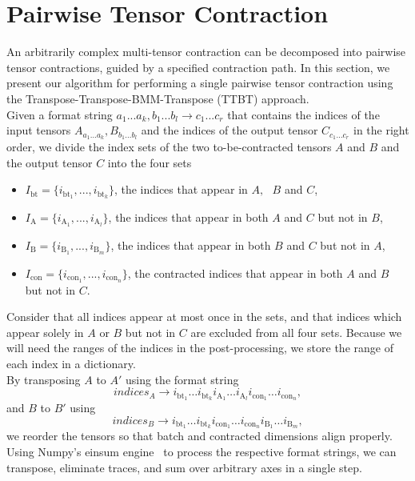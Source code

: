 \section{Pairwise Tensor Contraction}
An arbitrarily complex multi-tensor contraction can be decomposed into pairwise tensor contractions, guided by a specified
contraction path. In this section, we present our algorithm for performing a single pairwise tensor contraction using the Transpose-Transpose-BMM-Transpose (TTBT) approach.\\

\noindent Given a format string $a_1...a_k,b_1...b_l\rightarrow c_1...c_r$ that contains the indices of the input tensors $A_{a_1...a_k},B_{b_1...b_l}$ and the indices of the output tensor $C_{c_1...c_r}$ in the right order, we divide the index sets of the two to-be-contracted tensors $A$ and $B$ and the output tensor $C$ into the four sets
\begin{itemize}
    \item $I_{\text{bt}}= \{i_{\text{bt}_1},...,i_{\text{bt}_k}\}$, the indices that appear in $A, \text{ }B$ and $C$,
    \item $I_\text{A}=\{i_{\text{A}_1}, ...,i_{\text{A}_l}\}$, the indices that appear in both $A$ and $C$ but not in $B$,
    \item $I_\text{B}= \{i_{\text{B}_1} ,...,i_{\text{B}_m}\}$, the indices that appear in both $B$ and $C$ but not in $A$,
    \item $I_{\text{con}} = \{ i_{\text{con}_1}, ..., i_{\text{con}_n}\}$, the contracted indices that appear in both $A$ and $B$ but not in $C$.
\end{itemize}
Consider that all indices appear at most once in the sets, and that indices which appear solely in $A$ or $B$ but not in $C$ are excluded from all four sets. Because we will need the ranges of the indices in the post-processing, we store the range of each index in a dictionary.\\
By transposing $A$ to $A'$ using the format string  
$$indices_A \rightarrow i_{\text{bt}_1} \dots i_{\text{bt}_k} i_{\text{A}_1} \dots i_{\text{A}_l} i_{\text{con}_1} \dots i_{\text{con}_n},$$
and $B$ to $B'$ using  
$$indices_B \rightarrow i_{\text{bt}_1} \dots i_{\text{bt}_k} i_{\text{con}_1} \dots i_{\text{con}_n} i_{\text{B}_1} \dots i_{\text{B}_m},$$
\noindent we reorder the tensors so that batch and contracted dimensions align properly. Using Numpy’s einsum engine~\cite{Numpy} to process the respective format strings, we can transpose, eliminate traces, and sum over arbitrary axes in a single step.  \\
